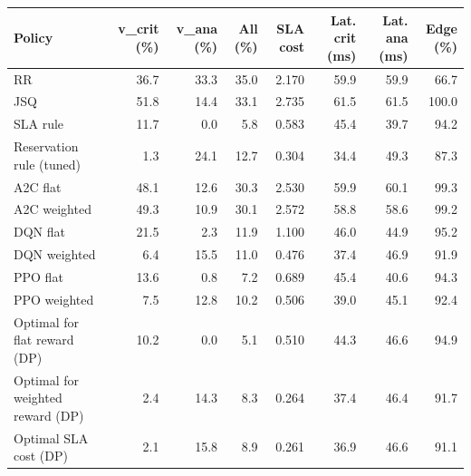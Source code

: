 \begin{tabular}{@{}lrrrrrrr@{}}
\toprule
Policy & v\_crit (\%) & v\_ana (\%) & All (\%) & SLA cost & Lat. crit (ms) & Lat. ana (ms) & Edge (\%) \\
\midrule
RR & 36.7 & 33.3 & 35.0 & 2.170 & 59.9 & 59.9 & 66.7 \\
JSQ & 51.8 & 14.4 & 33.1 & 2.735 & 61.5 & 61.5 & 100.0 \\
SLA rule & 11.7 & 0.0 & 5.8 & 0.583 & 45.4 & 39.7 & 94.2 \\
Reservation rule (tuned) & 1.3 & 24.1 & 12.7 & 0.304 & 34.4 & 49.3 & 87.3 \\
A2C flat & 48.1 & 12.6 & 30.3 & 2.530 & 59.9 & 60.1 & 99.3 \\
A2C weighted & 49.3 & 10.9 & 30.1 & 2.572 & 58.8 & 58.6 & 99.2 \\
DQN flat & 21.5 & 2.3 & 11.9 & 1.100 & 46.0 & 44.9 & 95.2 \\
DQN weighted & 6.4 & 15.5 & 11.0 & 0.476 & 37.4 & 46.9 & 91.9 \\
PPO flat & 13.6 & 0.8 & 7.2 & 0.689 & 45.4 & 40.6 & 94.3 \\
PPO weighted & 7.5 & 12.8 & 10.2 & 0.506 & 39.0 & 45.1 & 92.4 \\
Optimal for flat reward (DP) & 10.2 & 0.0 & 5.1 & 0.510 & 44.3 & 46.6 & 94.9 \\
Optimal for weighted reward (DP) & 2.4 & 14.3 & 8.3 & 0.264 & 37.4 & 46.4 & 91.7 \\
Optimal SLA cost (DP) & 2.1 & 15.8 & 8.9 & 0.261 & 36.9 & 46.6 & 91.1 \\
\bottomrule
\end{tabular}